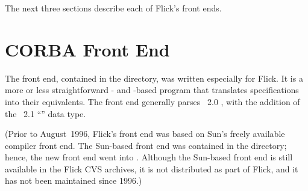 The next three sections describe each of Flick's front ends.



\section{CORBA Front End}
\label{sec:FE:CORBA Front End}

The \CORBA{} front end, contained in the  directory, was
written especially for Flick.  It is a more or less straightforward
- and -based program that translates \CORBA{} \IDL{}
specifications into their \AOI{} equivalents.  The front end generally parses
\CORBA{}~2.0 \IDL{}, with the addition of the \CORBA{}~2.1 ``''
data type.

(Prior to August~1996, Flick's \CORBA{} front end was based on Sun's freely
available \CORBA{} compiler front end.
The Sun-based \CORBA{} front end was contained in the 
directory; hence, the new front end went into .  Although
the Sun-based \CORBA{} front end is still available in the Flick CVS archives,
it is not distributed as part of Flick, and it has not been maintained since
1996.)

